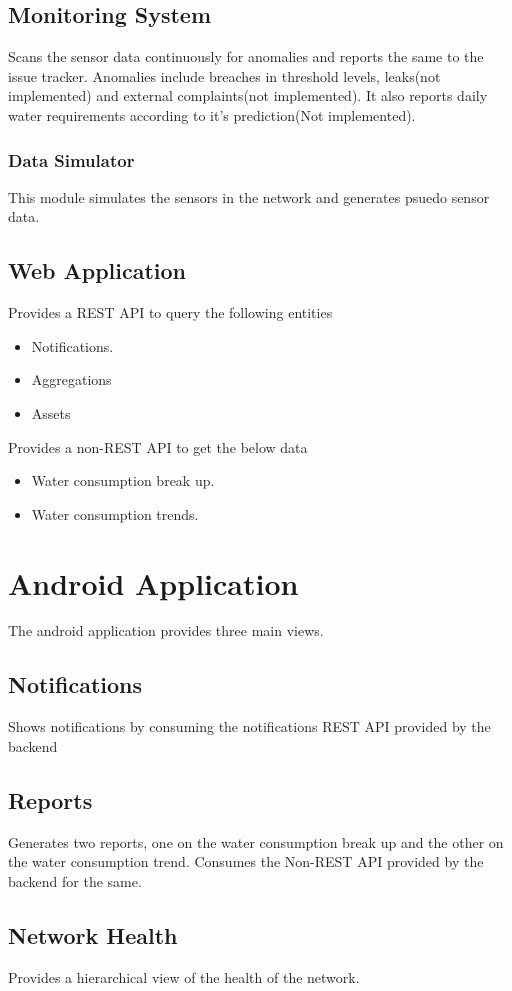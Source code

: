 \documentclass[11pt]{report} %
\begin{document}
\subsection{Monitoring System}
Scans the sensor data continuously for anomalies and reports the same to the issue tracker. Anomalies include breaches in threshold levels, leaks(not implemented) and external complaints(not implemented). It also reports daily water requirements according to it's prediction(Not implemented).
\subsubsection{Data Simulator}
This module simulates the sensors in the network and generates psuedo sensor data.
\subsection{Web Application}
\label{sec:web_application_api}
Provides a REST API to query  the following entities
\begin{itemize}
\item Notifications.
\item Aggregations
\item Assets
\end{itemize}
Provides a non-REST API to get the below data
\begin{itemize}
\item Water consumption break up.
\item Water consumption trends.
\end{itemize}
\section{Android Application}
The android application provides three main views.
\subsection{Notifications}
Shows notifications by consuming the \textsf{notifications REST API} provided by the backend
\subsection{Reports}
Generates two reports, one on the water consumption break up and the other on the water consumption trend. Consumes the Non-REST API provided by the backend for the same.
\subsection{Network Health}
Provides a hierarchical view of the health of the network.
\end{document}
